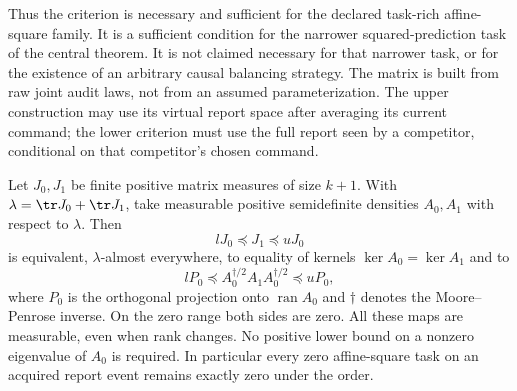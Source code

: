 Thus the criterion is necessary and sufficient for the declared task-rich affine-square family. It is a sufficient condition for the narrower squared-prediction task of the central theorem. It is not claimed necessary for that narrower task, or for the existence of an arbitrary causal balancing strategy. The matrix is built from raw joint audit laws, not from an assumed parameterization. The upper construction may use its virtual report space after averaging its current command; the lower criterion must use the full report seen by a competitor, conditional on that competitor's chosen command.

\begin{theorem}\label{thm:singular-order}
Let $J_0,J_1$ be finite positive matrix measures of size $k+1$. With
$\lambda=\tr J_0+\tr J_1$, take measurable positive semidefinite densities $A_0,A_1$ with respect to $\lambda$. Then
\begin{equation}\label{eq:singular-equivalence}
 lJ_0\preccurlyeq J_1\preccurlyeq uJ_0
\end{equation}
is equivalent, $\lambda$-almost everywhere, to equality of kernels
$\ker A_0=\ker A_1$ and to
\begin{equation}\label{eq:range-spectrum}
 lP_0\preccurlyeq A_0^{\dagger/2}A_1A_0^{\dagger/2}
            \preccurlyeq uP_0,
\end{equation}
where $P_0$ is the orthogonal projection onto $\operatorname{ran}A_0$ and $\dagger$ denotes the Moore--Penrose inverse. On the zero range both sides are zero. All these maps are measurable, even when rank changes. No positive lower bound on a nonzero eigenvalue of $A_0$ is required. In particular every zero affine-square task on an acquired report event remains exactly zero under the order.
\end{theorem}
